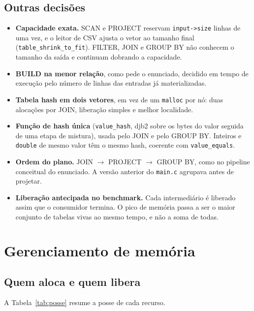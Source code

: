 \documentclass[11pt,a4paper]{article}
\begin{document}
\subsection{Outras decisões}
\begin{itemize}
    \item \textbf{Capacidade exata.} SCAN e PROJECT reservam \texttt{input->size} linhas de uma vez, e o leitor de CSV ajusta o vetor ao tamanho final (\texttt{table\_shrink\_to\_fit}). FILTER, JOIN e GROUP BY não conhecem o tamanho da saída e continuam dobrando a capacidade.
    \item \textbf{BUILD na menor relação}, como pede o enunciado, decidido em tempo de execução pelo número de linhas das entradas já materializadas.
    \item \textbf{Tabela hash em dois vetores}, em vez de um \texttt{malloc} por nó: duas alocações por JOIN, liberação simples e melhor localidade.
    \item \textbf{Função de hash única} (\texttt{value\_hash}, djb2 sobre os bytes do valor seguida de uma etapa de mistura), usada pelo JOIN e pelo GROUP BY. Inteiros e \texttt{double} de mesmo valor têm o mesmo hash, coerente com \texttt{value\_equals}.
    \item \textbf{Ordem do plano.} JOIN $\rightarrow$ PROJECT $\rightarrow$ GROUP BY, como no pipeline conceitual do enunciado. A versão anterior do \texttt{main.c} agrupava antes de projetar.
    \item \textbf{Liberação antecipada no benchmark.} Cada intermediário é liberado assim que o consumidor termina. O pico de memória passa a ser o maior conjunto de tabelas vivas ao mesmo tempo, e não a soma de todas.
\end{itemize}

\section{Gerenciamento de memória}\label{sec:memoria}

\subsection{Quem aloca e quem libera}
A Tabela~\ref{tab:posse} resume a posse de cada recurso.
\end{document}
